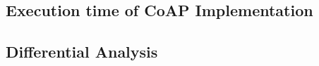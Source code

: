 \subsection{Execution time of CoAP Implementation}

\subsection{Differential Analysis}

%
%
%
%
%
%
